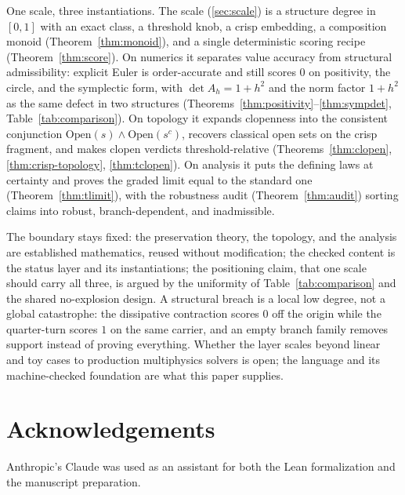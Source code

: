\documentclass[11pt,a4paper]{article}
\begin{document}
One scale, three instantiations.
The scale (\cref{sec:scale}) is a structure degree in $[0,1]$ with an
exact class, a threshold knob, a crisp embedding, a composition monoid
(Theorem~\ref{thm:monoid}), and a single deterministic scoring recipe
(Theorem~\ref{thm:score}).
On numerics it separates value accuracy from structural admissibility:
explicit Euler is order-accurate and still scores $0$ on positivity,
the circle, and the symplectic form, with $\det A_h = 1 + h^2$ and the
norm factor $1 + h^2$ as the same defect in two structures
(Theorems~\ref{thm:positivity}--\ref{thm:sympdet},
Table~\ref{tab:comparison}).
On topology it expands clopenness into the consistent conjunction
$\mathrm{Open}(s) \wedge \mathrm{Open}(s^c)$, recovers classical open
sets on the crisp fragment, and makes clopen verdicts
threshold-relative (Theorems~\ref{thm:clopen},
\ref{thm:crisp-topology}, \cref{thm:tclopen}).
On analysis it puts the defining laws at certainty and proves the
graded limit equal to the standard one (Theorem~\ref{thm:tlimit}),
with the robustness audit (Theorem~\ref{thm:audit}) sorting claims %
into robust, branch-dependent, and inadmissible. %

The boundary stays fixed: the preservation theory, the topology, and
the analysis are established mathematics, reused without modification;
the checked content is the status layer and its instantiations; the
positioning claim, that one scale should carry all three, is argued by
the uniformity of Table~\ref{tab:comparison} and the shared
no-explosion design.
A structural breach is a local low degree, not a global catastrophe:
the dissipative contraction scores $0$ off the origin while the
quarter-turn scores $1$ on the same carrier, and an empty branch
family removes support instead of proving everything.
Whether the layer scales beyond linear and toy cases to production
multiphysics solvers is open; the language and its machine-checked
foundation are what this paper supplies.

\section*{Acknowledgements}

Anthropic's Claude was used as an assistant for both the Lean
formalization and the manuscript preparation.

\end{document}
